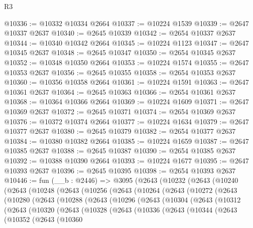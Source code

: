 \begin{lexlean}{R3}
\begin{coremodule}
@10336 := @10332 @10334 @2664
@10337 := @10224 @1539
@10339 := @2647 @10337 @2637
@10340 := @2645 @10339
@10342 := @2654 @10337 @2637
@10344 := @10340 @10342 @2664
@10345 := @10224 @1123
@10347 := @2647 @10345 @2637
@10348 := @2645 @10347
@10350 := @2654 @10345 @2637
@10352 := @10348 @10350 @2664
@10353 := @10224 @1574
@10355 := @2647 @10353 @2637
@10356 := @2645 @10355
@10358 := @2654 @10353 @2637
@10360 := @10356 @10358 @2664
@10361 := @10224 @1591
@10363 := @2647 @10361 @2637
@10364 := @2645 @10363
@10366 := @2654 @10361 @2637
@10368 := @10364 @10366 @2664
@10369 := @10224 @1609
@10371 := @2647 @10369 @2637
@10372 := @2645 @10371
@10374 := @2654 @10369 @2637
@10376 := @10372 @10374 @2664
@10377 := @10224 @1634
@10379 := @2647 @10377 @2637
@10380 := @2645 @10379
@10382 := @2654 @10377 @2637
@10384 := @10380 @10382 @2664
@10385 := @10224 @1659
@10387 := @2647 @10385 @2637
@10388 := @2645 @10387
@10390 := @2654 @10385 @2637
@10392 := @10388 @10390 @2664
@10393 := @10224 @1677
@10395 := @2647 @10393 @2637
@10396 := @2645 @10395
@10398 := @2654 @10393 @2637
@10446 := fun (__b : @2446) =>
  @3095
    (@2643
      (@10232
        (@2643
          (@10240
            (@2643
              (@10248
                (@2643
                  (@10256
                    (@2643
                      (@10264
                        (@2643
                          (@10272
                            (@2643
                              (@10280
                                (@2643
                                  (@10288
                                    (@2643
                                      (@10296
                                        (@2643
                                          (@10304
                                            (@2643
                                              (@10312
                                                (@2643
                                                  (@10320
                                                    (@2643
                                                      (@10328
                                                        (@2643
                                                          (@10336
                                                            (@2643
                                                              (@10344
                                                                (@2643
                                                                  (@10352
                                                                    (@2643
                                                                      (@10360

\end{coremodule}
\end{lexlean}
